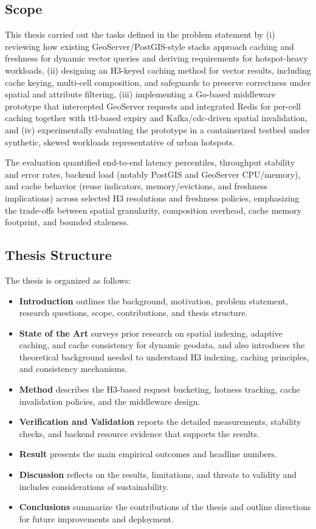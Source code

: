 \subsection{Scope}
This thesis carried out the tasks defined in the problem statement by (i) reviewing how existing GeoServer/PostGIS-style stacks approach caching and freshness for dynamic vector queries and deriving requirements for hotspot-heavy workloads, (ii) designing an H3-keyed caching method for vector results, including cache keying, multi-cell composition, and safeguards to preserve correctness under spatial and attribute filtering, (iii) implementing a Go-based middleware prototype that intercepted GeoServer requests and integrated Redis for per-cell caching together with \ac{ttl}-based expiry and Kafka/\ac{cdc}-driven spatial invalidation, and (iv) experimentally evaluating the prototype in a containerized testbed under synthetic, skewed workloads representative of urban hotspots.

The evaluation quantified end-to-end latency percentiles, throughput stability and error rates, backend load (notably PostGIS and GeoServer CPU/memory), and cache behavior (reuse indicators, memory/evictions, and freshness implications) across selected H3 resolutions and freshness policies, emphasizing the trade-offs between spatial granularity, composition overhead, cache memory footprint, and bounded staleness.

\subsection{Thesis Structure}
The thesis is organized as follows:
\begin{itemize}
  \item \textbf{Introduction} outlines the background, motivation, problem statement, research questions, scope, contributions, and thesis structure.
  \item \textbf{State of the Art} surveys prior research on spatial indexing, adaptive caching, and cache consistency for dynamic geodata, and also introduces the theoretical background needed to understand H3 indexing, caching principles, and consistency mechanisms.
  \item \textbf{Method} describes the H3-based request bucketing, hotness tracking, cache invalidation policies, and the middleware design.
  \item \textbf{Verification and Validation} reports the detailed measurements, stability checks, and backend resource evidence that supports the results.
  \item \textbf{Result} presents the main empirical outcomes and headline numbers.
  \item \textbf{Discussion} reflects on the results, limitations, and threats to validity and includes considerations of sustainability.
  \item \textbf{Conclusions} summarize the contributions of the thesis and outline directions for future improvements and deployment.
\end{itemize}
